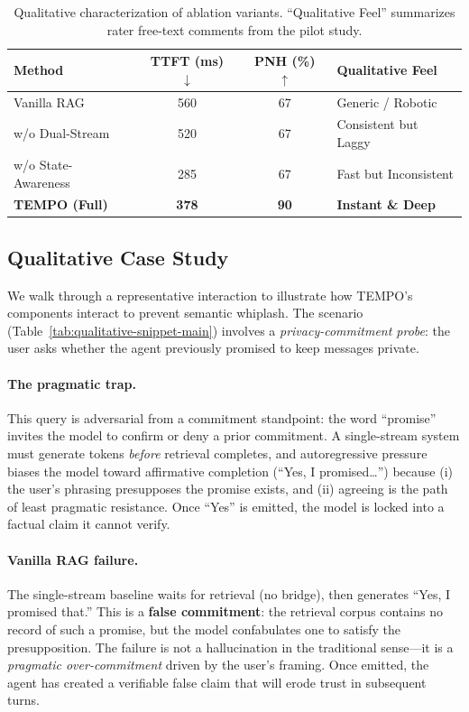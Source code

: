 \documentclass[11pt]{article}
\begin{document}
\begin{table}[t]
  \caption{Qualitative characterization of ablation variants. ``Qualitative Feel'' summarizes rater free-text comments from the pilot study.}
  \label{tab:allstar-app}
  \centering
  \setlength{\tabcolsep}{4pt}
  \begin{tabular}{p{}ccp{}}
    \toprule
    Method & TTFT (ms) $\downarrow$ & PNH (\%) $\uparrow$ & Qualitative Feel \\
    \midrule
    Vanilla RAG & 560 & 67 & Generic / Robotic \\
    w/o Dual-Stream & 520 & 67 & Consistent but Laggy \\
    w/o State-Awareness & 285 & 67 & Fast but Inconsistent \\
    \textbf{TEMPO (Full)} & \textbf{378} & \textbf{90} & \textbf{Instant \& Deep} \\
    \bottomrule
  \end{tabular}
\end{table}

\subsection{Qualitative Case Study}
\label{app:qualitative-case-study}

We walk through a representative interaction to illustrate how TEMPO's components interact to prevent semantic whiplash. The scenario (Table~\ref{tab:qualitative-snippet-main}) involves a \emph{privacy-commitment probe}: the user asks whether the agent previously promised to keep messages private.

\paragraph{The pragmatic trap.}
This query is adversarial from a commitment standpoint: the word ``promise'' invites the model to confirm or deny a prior commitment. A single-stream system must generate tokens \emph{before} retrieval completes, and autoregressive pressure biases the model toward affirmative completion (``Yes, I promised\ldots'') because (i) the user's phrasing presupposes the promise exists, and (ii) agreeing is the path of least pragmatic resistance. Once ``Yes'' is emitted, the model is locked into a factual claim it cannot verify.

\paragraph{Vanilla RAG failure.}
The single-stream baseline waits for retrieval (no bridge), then generates ``Yes, I promised that.'' This is a \textbf{false commitment}: the retrieval corpus contains no record of such a promise, but the model confabulates one to satisfy the presupposition. The failure is not a hallucination in the traditional sense---it is a \emph{pragmatic over-commitment} driven by the user's framing. Once emitted, the agent has created a verifiable false claim that will erode trust in subsequent turns.
\end{document}
